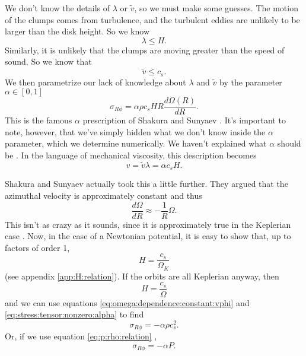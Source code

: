 \documentclass[]{article}
\newcommand{\dR}[1]{\frac{d #1}{dR}}
\begin{document}
We don't know the details of $\lambda$ or $\tilde{v}$, so we must make
some guesses. The motion of the clumps comes from turbulence, and the
turbulent eddies are unlikely to be larger than the disk height. So we
know \cite{Frank,Melia}
\begin{equation}
  \label{eq:lambda:bound}
  \lambda \leq H.
\end{equation}
Similarly, it is unlikely that the clumps are moving greater than the
speed of sound. So we know that \cite{Frank,Melia}
\begin{equation}
  \label{eq:v:tilde:bound}
  \tilde{v} \leq c_s.
\end{equation}
We then parametrize our lack of knowledge about $\lambda$ and
$\tilde{v}$ by the parameter $\alpha \in [0,1]$ \cite{Frank,Melia}
\begin{equation}
  \label{eq:stress:tensor:nonzero:alpha}
  \sigma_{R\phi} = \alpha \rho c_s H R\dR{\Omega(R)}.
\end{equation}
This is the famous $\alpha$ prescription of Shakura and Sunyaev
\cite{ShakuraSunyaev73}. It's important to note, however, that we've
simply hidden what we don't know inside the $\alpha$ parameter, which
we determine numerically. We haven't explained what $\alpha$ should be
\cite{Frank,Melia}. In the language of mechanical viscosity, this
description becomes
\begin{equation}
  \label{eq:alpha:prescription:viscosity}
  v = \tilde{v}\lambda = \alpha c_s H.
\end{equation}

Shakura and Sunyaev actually took this a little further. They argued
that the azimuthal velocity is approximately constant and thus
\begin{equation}
  \label{eq:omega:dependence:constant:vphi}
  \dR{\Omega} \approx - \frac{1}{R} \Omega.
\end{equation}
This isn't as crazy as it sounds, since it is approximately true in the
Keplerian case \cite{ShakuraSunyaev73,ThortonMarion}. Now, in the
case of a Newtonian potential, it is easy to show that, up to factors
of order 1,
\begin{equation}
  \label{eq:H:def}
  H = \frac{c_s}{\Omega_K}
\end{equation}
(see appendix \ref{app:H:relation}). If the orbits are all Keplerian
anyway, then 
$$H = \frac{c_s}{\Omega}$$
and we can use equations \eqref{eq:omega:dependence:constant:vphi} and
\eqref{eq:stress:tensor:nonzero:alpha} to find
\begin{equation}
  \label{eq:alpha:prescription:rho}
  \sigma_{R\phi} = -\alpha \rho c_s^2.
\end{equation}
Or, if we use equation \eqref{eq:p:rho:relation} \cite{Shafee08},
\begin{equation}
  \label{eq:alpha:prescription:P}
  \sigma_{R\phi} = -\alpha P.
\end{equation}
\end{document}
